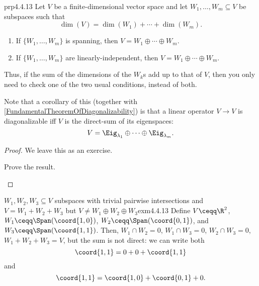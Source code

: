 \begin{prp}{}{prp4.4.13}
	Let $V$ be a finite-dimensional vector space and let $W_1,\ldots ,W_m\subseteq V$ be subspaces such that
	\begin{equation}
		\dim (V)=\dim (W_1)+\cdots +\dim (W_m).
	\end{equation}
	\begin{enumerate}
		\item If $\{ W_1,\ldots ,W_m\}$ is spanning, then $V=W_1\oplus \cdots \oplus W_m$.
		\item If $\{ W_1,\ldots ,W_m\}$ are linearly-independent, then $V=W_1\oplus \cdots \oplus W_m$.
	\end{enumerate}
	\begin{rmk}
		Thus, if the sum of the dimensions of the $W_k$s add up to that of $V$, then you only need to check one of the two usual conditions, instead of both.
	\end{rmk}
	\begin{rmk}
		Note that a corollary of this (together with \cref{FundamentalTheoremOfDiagonalizability}) is that a linear operator $V\rightarrow V$ is diagonalizable iff $V$ is the direct-sum of its eigenspaces:
		\begin{equation}
			V=\Eig _{\lambda _1}\oplus \cdots \oplus \Eig _{\lambda _m}.
		\end{equation}
	\end{rmk}
	\begin{proof}
		We leave this as an exercise.
		\begin{exr}[breakable=false]{}{}
			Prove the result.
		\end{exr}
	\end{proof}
\end{prp}
\begin{exm}{$W_1,W_2,W_3\subseteq V$ subspaces with trivial pairwise intersections and $V=W_1+W_2+W_3$ but $V\neq W_1\oplus W_2\oplus W_3$}{exm4.4.13}
	Define $V\ceqq \R ^2$, $W_1\ceqq \Span (\coord{1,0})$, $W_2\ceqq \Span (\coord{0,1})$, and $W_3\ceqq \Span (\coord{1,1})$.  Then, $W_1\cap W_2=0$, $W_1\cap W_3=0$, $W_2\cap W_3=0$, $W_1+W_2+W_3=V$, but the sum is not direct:  we can write both
	\begin{equation}
		\coord{1,1}=0+0+\coord{1,1}
	\end{equation}
	and
	\begin{equation}
		\coord{1,1}=\coord{1,0}+\coord{0,1}+0.
	\end{equation}
\end{exm}

